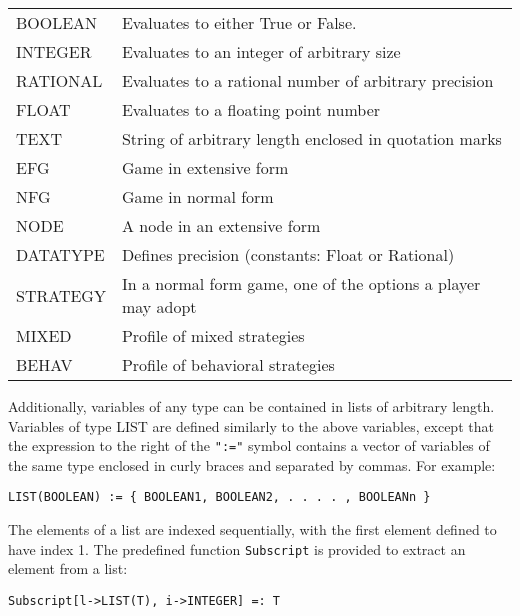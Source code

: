 \begin{tabular}{lp{4in}}
BOOLEAN & Evaluates to either True or False. \\ 

INTEGER & Evaluates to an integer of arbitrary size \\ 

RATIONAL & Evaluates to a rational number of arbitrary precision\\ 

FLOAT 	& Evaluates to a floating point number \\

TEXT	& String of arbitrary length enclosed in quotation marks\\ 

EFG	& Game in extensive form\\

NFG	& Game in normal form\\

NODE	& A node in an extensive form\\

DATATYPE & Defines precision (constants: Float or
Rational) \\ 

STRATEGY & In a normal form game, one of the options a player may adopt\\

MIXED	& Profile of mixed strategies\\

BEHAV	& Profile of behavioral strategies
\end{tabular}

\medskip

\noindent
Additionally, variables of any type can be contained in lists of arbitrary
length.
Variables of type LIST are defined similarly to the above variables,
except that the expression to the right of the {\tt ":="} symbol
contains a vector of variables of the same type enclosed in curly braces
and separated by commas.  For example:

\begin{verbatim}
LIST(BOOLEAN) := { BOOLEAN1, BOOLEAN2, . . . . , BOOLEANn }
\end{verbatim}

The elements of a list are indexed sequentially, with the first element
defined to have index 1.  The predefined function \verb+Subscript+ is
provided to extract an element from a list:

\begin{verbatim}
Subscript[l->LIST(T), i->INTEGER] =: T
\end{verbatim}

